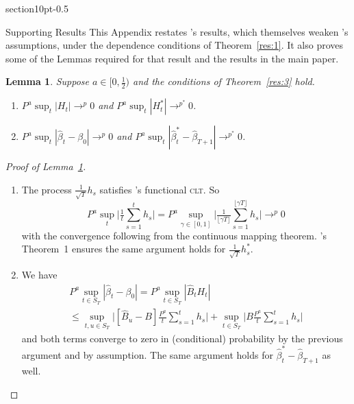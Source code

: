 \documentclass[10pt,fleqn,draft]{article}
\makeatletter
\newcommand\citepos[2][]{\citeauthor{#2}'s \citeyearpar[#1]{#2}}
\renewcommand\section{\@startsection%
{section}{1}{0pt}{-\baselineskip}{0.5\baselineskip}%
{\normalfont\normalsize\bfseries\large\raggedright}}
\newtheorem{lema}{Lemma}[section]
\theoremstyle{definition}
\newcommand{\clt}{\textsc{clt}}
\makeatother
\begin{document}
\appendix
\section{Supporting Results}
This Appendix restates \citepos{Mcc:00} results, which themselves
weaken \citepos{Wes:96} assumptions, under the dependence conditions
of Theorem~\ref{res:1}.  It also proves some of the Lemmas required
for that result and the results in the main paper.

\begin{lema}\label{res:a2}
  Suppose $a \in [0,\frac12)$ and the conditions of Theorem~\ref{res:3}
  hold.
  \begin{enumerate}
  \item $P^a \sup_t | H_{t} | \to^p 0$ and $P^a \sup_t | H_{t}^{*} |
    \to^{p^{*}} 0$.
  \item $P^a \sup_t | \hat{\beta}_{t} - \beta_{0} | \to^{p} 0$ and
    $P^a \sup_t | \hat{\beta}^{*}_{t} - \hat{\beta}_{T+1} |
    \to^{p^{*}} 0$.
  \end{enumerate}
\end{lema}

\begin{proof}[Proof of Lemma~\ref{res:a2}] \quad
  \begin{enumerate}
  \item The process $\tfrac{1}{\sqrt{T}} h_{s}$ satisfies \citepos[Theorem
    3.1]{JoD:00b} functional \clt.  So
    \begin{equation}
      P^a \sup_t \Big| \tfrac1t \sum_{s=1}^t h_{s} \Big| =
      P^a \sup_{\gamma \in [0,1]} \Big| \tfrac{1}{\lfloor \gamma
        T\rfloor} \sum_{s=1}^{\lfloor \gamma T \rfloor} h_{s} \Big| \to^{p} 0
    \end{equation}
    with the convergence following from the continuous mapping
    theorem.  \citepos{Cal:11d} Theorem~1 ensures the same argument
    holds for $\tfrac{1}{\sqrt{T}} h_s^{*}$.
  \item We have
    \begin{multline}
      P^a \sup_{t \in S_T} | \hat{\beta}_t - \beta_0 | = P^a \sup_{t
        \in S_T} |\hat{B}_{t} H_{t}| \\ \leq \sup_{t,u \in S_T} \Big|
      [ \hat{B}_u - B] \tfrac{P^a}{t} \sum_{s=1}^t h_{s} \Big| + \sup_{t\in S_T} \Big|
      B \tfrac{P^a}{t} \sum_{s=1}^t h_{s} \Big|
    \end{multline}
    and both terms converge to zero in (conditional) probability by
    the previous argument and by assumption.  The same argument holds
    for $\hat{\beta}_t^{*} - \hat{\beta}_{T+1}$ as well.
  \end{enumerate}
\end{proof}
\end{document}
